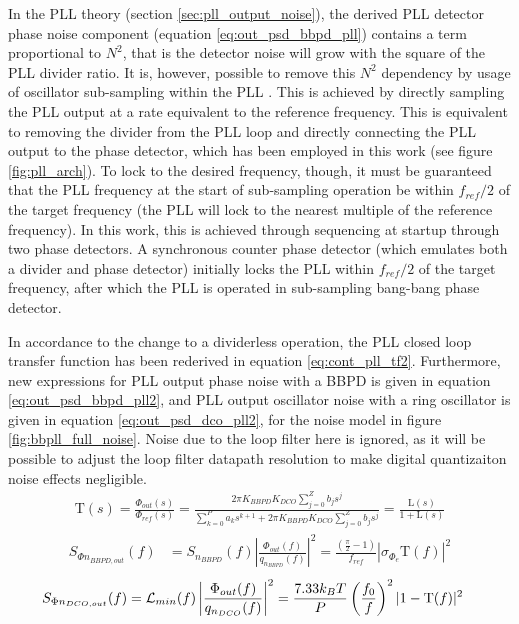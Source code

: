 In the PLL theory (section \ref{sec:pll_output_noise}), the derived PLL detector phase noise component (equation \ref{eq:out_psd_bbpd_pll}) contains a term proportional to $N^2$, that is the detector noise will grow with the square of the PLL divider ratio. It is, however, possible to remove this $N^2$ dependency by usage of oscillator sub-sampling within the PLL \cite{Gao2015}. This is achieved by directly sampling the PLL output at a rate equivalent to the reference frequency. This is equivalent to removing the divider from the PLL loop and directly connecting the PLL output to the phase detector, which has been employed in this work (see figure \ref{fig:pll_arch}). To lock to the desired frequency, though, it must be guaranteed that the PLL frequency at the start of sub-sampling operation be within $f_{ref}/2$ of the target frequency (the PLL will lock to the nearest multiple of the reference frequency). In this work, this is achieved through sequencing at startup through two phase detectors. A synchronous counter phase detector (which emulates both a divider and phase detector) initially locks the PLL within $f_{ref}/2$ of the target frequency, after which the PLL is operated in sub-sampling bang-bang phase detector.

  In accordance to the change to a dividerless operation, the PLL closed loop transfer function has been rederived in equation \ref{eq:cont_pll_tf2}. Furthermore, new expressions for PLL output phase noise with a BBPD is given in equation \ref{eq:out_psd_bbpd_pll2}, and PLL output oscillator noise with a ring oscillator is given in equation \ref{eq:out_psd_dco_pll2}, for the noise model in figure \ref{fig:bbpll_full_noise}. Noise due to the loop filter here is ignored, as it will be possible to adjust the loop filter datapath resolution to make digital quantizaiton noise effects negligible.
		\begin{align} \label{eq:cont_pll_tf2}
			\mathrm{T}(s) = \frac{\Phi_{out}(s)}{\Phi_{ref}(s)} = \frac{2\pi K_{BBPD}K_{DCO}\sum_{j=0}^Z b_js^j}{\sum_{k=0}^P a_ks^{k+1} + 2\pi K_{BBPD}K_{DCO}\sum_{j=0}^Z b_js^j} = \frac{\mathrm{L}(s)}{1 + \mathrm{L}(s)}
		\end{align}
		\begin{align}\label{eq:out_psd_bbpd_pll2}
			S_{\Phi n_{BBPD,out}}(f) &= S_{n_{BBPD}}(f)\left|\frac{\Phi_{out}(f)}{q_{n_{BBPD}}(f)}\right|^2 = \frac{\left(\frac{\pi}{2}-1\right)}{f_{ref}}\left|\sigma_{\Phi_e}\mathrm{T}(f)\right|^2
		\end{align}
		\begin{align}\label{eq:out_psd_dco_pll2}
			S_{\Phi n_{DCO,out}}(f) &= \mathcal{L}_{min}(f)\left|\frac{\Phi_{out}(f)}{q_{n_{DCO}}(f)}\right|^2 = \frac{7.33k_BT}{P}\left(\frac{f_0}{f}\right)^2|1-\textnormal{T}(f)|^2 
		\end{align}

